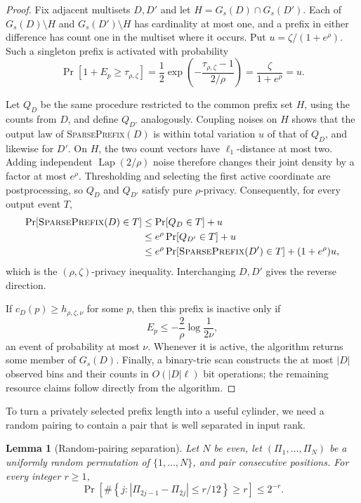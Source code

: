\documentclass[11pt]{article}
\newtheorem{lemma}{Lemma}[section]
\begin{document}
\begin{proof}
Fix adjacent multisets $D,D'$ and let
$H=G_s(D)\cap G_s(D')$.  Each of
$G_s(D)\setminus H$ and $G_s(D')\setminus H$ has cardinality at most one,
and a prefix in either difference has count one in the multiset where it
occurs.  Put $u=\zeta/(1+e^\rho)$.  Such a singleton prefix is activated with
probability
\begin{equation}
 \Pr[1+E_p\ge\tau_{\rho,\zeta}]
 =\frac12\exp\left(-\frac{\tau_{\rho,\zeta}-1}{2/\rho}\right)
 =\frac{\zeta}{1+e^\rho}=u.
 \label{eq:singleton-tail}
\end{equation}

Let $Q_D$ be the same procedure restricted to the common prefix set $H$,
using the counts from $D$, and define $Q_{D'}$ analogously.  Coupling noises
on $H$ shows that the output law of \textsc{SparsePrefix}$(D)$ is within
total variation $u$ of that of $Q_D$, and likewise for $D'$.  On $H$, the
two count vectors have $\ell_1$-distance at most two.  Adding independent
$\operatorname{Lap}(2/\rho)$ noise therefore changes their joint density by
a factor at most $e^\rho$.  Thresholding and selecting the first active
coordinate are postprocessing, so $Q_D$ and $Q_{D'}$ satisfy pure
$\rho$-privacy.  Consequently, for every output event $T$,
\[
 \begin{aligned}
 \Pr[\text{\textsc{SparsePrefix}}(D)\in T]
 &\le \Pr[Q_D\in T]+u\\
 &\le e^\rho\Pr[Q_{D'}\in T]+u\\
 &\le e^\rho\Pr[\text{\textsc{SparsePrefix}}(D')\in T]
       +(1+e^\rho)u,
 \end{aligned}
\]
which is the $(\rho,\zeta)$-privacy inequality.  Interchanging $D,D'$ gives
the reverse direction.

If $c_D(p)\ge h_{\rho,\zeta,\nu}$ for some $p$, then this prefix is inactive
only if
\[
 E_p\le-\frac2\rho\log\frac1{2\nu},
\]
an event of probability at most $\nu$.  Whenever it is active, the algorithm
returns some member of $G_s(D)$.  Finally, a binary-trie scan constructs the
at most $|D|$ observed bins and their counts in $O(|D|\ell)$ bit operations;
the remaining resource claims follow directly from the algorithm.
\end{proof}

To turn a privately selected prefix length into a useful cylinder, we need a
random pairing to contain a pair that is well separated in input rank.

\begin{lemma}[Random-pairing separation]
\label{lem:pairing}
Let $N$ be even, let $(\Pi_1,\ldots,\Pi_N)$ be a uniformly random
permutation of $\{1,\ldots,N\}$, and pair consecutive positions.  For every
integer $r\ge1$,
\begin{equation}
 \Pr\left[
  \#\left\{j:|\Pi_{2j-1}-\Pi_{2j}|\le r/12\right\}\ge r
 \right]\le2^{-r}.
 \label{eq:pairing-bound}
\end{equation}
\end{lemma}
\end{document}
